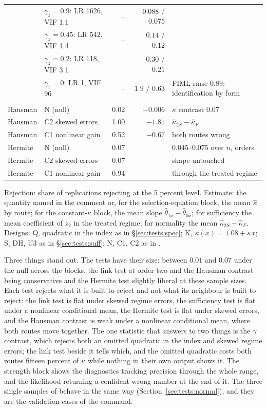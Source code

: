\documentclass[11pt,a4paper]{article}
\theoremstyle{plain}
\theoremstyle{definition}
\theoremstyle{remark}
\newcommand{\1}{\mathbf{1}}
\newcommand{\kX}{\kappa(x)}
\begin{document}
\begin{table}[p]
\begin{tabular}{@{}lL{4.9cm}rrL{4.4cm}@{}}
 & $\gamma_z=0.9$: LR 1626, VIF 1.1 & -- & $0.088$ / $0.075$ & \\
 & $\gamma_z=0.45$: LR 542, VIF 1.4 & -- & $0.14$ / $0.12$ & \\
 & $\gamma_z=0.2$: LR 118, VIF 3.1 & -- & $0.30$ / $0.21$ & \\
 & $\gamma_z=0$: LR 1, VIF 96 & -- & $1.9$ / $0.63$ & FIML rmse $0.89$: identification by form \\
\addlinespace
{} \\
 Hausman & N (null) & 0.02 & $-0.006$ & $\kappa$ contrast $0.07$ \\
 Hausman & C2 skewed errors & 1.00 & $-1.81$ & $\hat\kappa_{2S}-\hat\kappa_F$ \\
 Hausman & C1 nonlinear gain & 0.52 & $-0.67$ & both routes wrong \\
 Hermite & N (null) & 0.07 & & $0.045$--$0.075$ over $n$, orders \\
 Hermite & C2 skewed errors & 0.07 & & shape untouched \\
 Hermite & C1 nonlinear gain & 0.94 & & through the treated regime \\
\bottomrule
\end{tabular}
\parbox{0.95\textwidth}{\footnotesize Rejection: share of replications rejecting at the 5 percent level. Estimate: the quantity named in the comment or, for the selection-equation block, the mean $\hat\kappa$ by route; for the constant-$\kappa$ block, the mean slope $\hat\theta_{1x}-\hat\theta_{0x}$; for sufficiency the mean coefficient of $z_2$ in the treated regime; for normality the mean $\hat\kappa_{2S}-\hat\kappa_F$. Designs: Q, quadratic in the index as in \S\ref{sec:tests:spec}; K, $\kX=1.08+s\,x$; S, DH, U3 as in \S\ref{sec:tests:suff}; N, C1, C2 as in \citet{araar2026sog}.}
\end{table}

Three things stand out. The tests have their size: between $0.01$ and
$0.07$ under the null across the blocks, the link test at order two and
the Hausman contrast being conservative and the Hermite test slightly
liberal at these sample sizes. Each test rejects what it is built to
reject and not what its neighbour is built to reject: the link test is
flat under skewed regime errors, the sufficiency test is flat under a
nonlinear conditional mean, the Hermite test is flat under skewed
errors, and the Hausman contrast is weak under a nonlinear conditional
mean, where both routes move together. The one statistic that answers
to two things is the $\gamma$ contrast, which rejects both an omitted
quadratic in the index and skewed regime errors; the link test beside
it tells which, and the omitted quadratic costs both routes fifteen
percent of $\kappa$ while nothing in their own output shows it. The strength block shows the
diagnostics tracking precision through the whole range, and the
likelihood returning a confident wrong number at the end of it. The
three single samples of \citet{araar2026msat} behave in the same way
(Section~\ref{sec:tests:normal}), and they are the validation cases of
the command.
\end{document}
